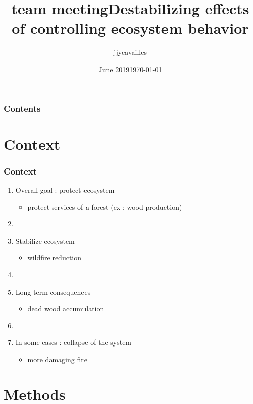 \documentclass{beamer}
\title{team meeting}
\author{jjycavailles }
\date{June 2019}
\title{Destabilizing effects of controlling ecosystem behavior}
\author[Jérôme Cavaillès, Yuval Zelnik]{%
  \texorpdfstring{%
    \begin{columns}
      \column{.33\linewidth}
      \centering
      \it{Jérôme Cavaillès} \\ INSA Toulouse \\ Paul Sabatier
      \column{.33\linewidth}
      \centering
     Supervisor \\ \it{Yuval Zelnik} \\ \it{Michel Loreau}
    \end{columns}
 }
 {Author 1, Author 2, Author 3}
}
\date{\today}
\institute{%
  \texorpdfstring{%
    \begin{columns}
      \column{.9\linewidth}
      \centering
    \end{columns}
 }
 {Author 1, Author 2, Author 3}
}
\begin{document}
\begin{frame}[plain,t]
\titlepage
\end{frame}



\begin{frame}
\frametitle{Contents} 
\tableofcontents
\end{frame}



\section{Context}

\begin{frame}
\frametitle{Context} %
\begin{enumerate}
\item Overall goal : protect ecosystem
\begin{itemize}
    \item protect services of a forest (ex : wood production)
\end{itemize}
\item[]
\item Stabilize ecosystem 
\begin{itemize}
    \item wildfire reduction
\end{itemize}
\item[]
\item Long term consequences 
\begin{itemize}
    \item dead wood accumulation
\end{itemize}
\item[]
\item In some cases : collapse of the system 
\begin{itemize}
    \item more damaging fire
\end{itemize}
\end{enumerate}
\end{frame}




\section{Methods}
\end{document}
